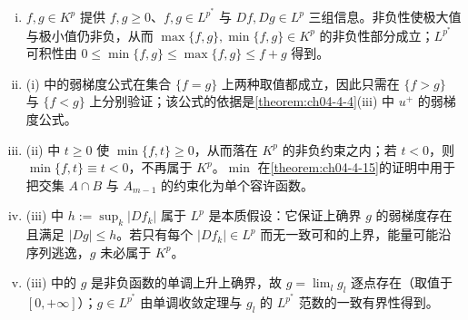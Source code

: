 \documentclass[../../main.tex]{subfiles}%
\begin{document}
\begin{remark}\label{remark:ch04-thm-4-13-条件}
\begin{enumerate}[(i)]
\item $f,g\in K^p$ 提供 $f,g\geqslant0$、$f,g\in L^{p^*}$ 与 $Df,Dg\in L^p$ 三组信息。非负性使极大值与极小值仍非负，从而 $\max\{f,g\},\min\{f,g\}\in K^p$ 的非负性部分成立；$L^{p^*}$ 可积性由 $0\leqslant\min\{f,g\}\leqslant\max\{f,g\}\leqslant f+g$ 得到。
\item (i) 中的弱梯度公式在集合 $\{f=g\}$ 上两种取值都成立，因此只需在 $\{f>g\}$ 与 $\{f<g\}$ 上分别验证；该公式的依据是\cref{theorem:ch04-4-4}(iii) 中 $u^+$ 的弱梯度公式。%
\item (ii) 中 $t\geqslant0$ 使 $\min\{f,t\}\geqslant0$，从而落在 $K^p$ 的非负约束之内；若 $t<0$，则 $\min\{f,t\}\equiv t<0$，不再属于 $K^p$。$\min$ 在\cref{theorem:ch04-4-15}的证明中用于把交集 $A\cap B$ 与 $A_{m-1}$ 的约束化为单个容许函数。%
\item (iii) 中 $h:=\sup_k\lvert Df_k\rvert$ 属于 $L^p$ 是本质假设：它保证上确界 $g$ 的弱梯度存在且满足 $\lvert Dg\rvert\leqslant h$。若只有每个 $\lvert Df_k\rvert\in L^p$ 而无一致可和的上界，能量可能沿序列逃逸，$g$ 未必属于 $K^p$。
\item (iii) 中的 $g$ 是非负函数的单调上升上确界，故 $g=\lim_l g_l$ 逐点存在（取值于 $[0,+\infty]$）；$g\in L^{p^*}$ 由单调收敛定理与 $g_l$ 的 $L^{p^*}$ 范数的一致有界性得到。
\end{enumerate}
\end{remark}
\end{document}
